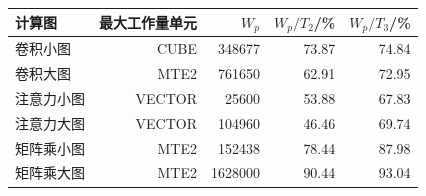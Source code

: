 \begin{tabular}{lrrrr}\toprule
计算图 & 最大工作量单元 & $W_p$ & $W_p/T_2$/\% & $W_p/T_3$/\%\\\midrule
卷积小图 & CUBE & 348677 & 73.87 & 74.84\\
卷积大图 & MTE2 & 761650 & 62.91 & 72.95\\
注意力小图 & VECTOR & 25600 & 53.88 & 67.83\\
注意力大图 & VECTOR & 104960 & 46.46 & 69.74\\
矩阵乘小图 & MTE2 & 152438 & 78.44 & 87.98\\
矩阵乘大图 & MTE2 & 1628000 & 90.44 & 93.04\\
\bottomrule\end{tabular}
